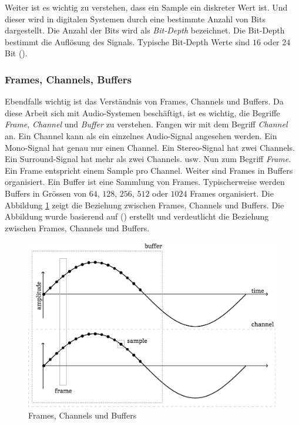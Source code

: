 \documentclass[11pt,a4paper]{article}
\begin{document}
\noindent
\newline
Weiter ist es wichtig zu verstehen, dass ein Sample ein diskreter Wert ist. Und dieser wird in
digitalen Systemen durch eine bestimmte Anzahl von Bits dargestellt. Die Anzahl der Bits wird
als \textit{Bit-Depth} bezeichnet. Die Bit-Depth bestimmt die Auflösung des Signals. Typische
Bit-Depth Werte sind \(16\) oder \(24\) Bit (\cite[p.10]{somberg2019audioapi}). 

\subsubsection{Frames, Channels, Buffers}
Ebendfalls wichtig ist das Verständnis von Frames, Channels und Buffers. Da diese Arbeit sich mit
Audio-Systemen beschäftigt, ist es wichtig, die Begriffe \textit{Frame}, \textit{Channel} und
\textit{Buffer} zu verstehen. Fangen wir mit dem Begriff \textit{Channel} an. Ein Channel kann als
ein einzelnes Audio-Signal angesehen werden. Ein Mono-Signal hat genau nur einen Channel. Ein
Stereo-Signal hat zwei Channels. Ein Surround-Signal hat mehr als zwei Channels. usw.
Nun zum Begriff \textit{Frame}. Ein Frame entspricht einem Sample pro Channel. Weiter sind Frames 
in Buffers organisiert. Ein Buffer ist eine Sammlung von Frames. Typischerweise werden Buffers in 
Grössen von \(64\), \(128\), \(256\), \(512\) oder \(1024\) Frames organisiert. Die Abbildung 
\ref{fig:frames_channels_buffers} zeigt die Beziehung zwischen Frames, Channels und Buffers. 
Die Abbildung wurde basierend auf (\cite[p.10]{somberg2019audioapi}) erstellt und verdeutlicht die
Beziehung zwischen Frames, Channels und Buffers.

\begin{figure}[h]
    \centering
    \includegraphics[width=0.7\linewidth]{img/audio-nutshell.pdf}
    \caption{Frames, Channels und Buffers}
    \label{fig:frames_channels_buffers}
\end{figure}
\end{document}
